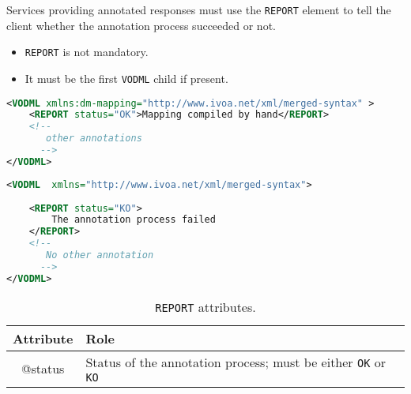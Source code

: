 Services providing annotated responses must use the \texttt{REPORT}  element to tell the client whether the annotation process succeeded or not.

\begin{itemize}
\item \texttt{REPORT} is not mandatory.
\item It must be the first \texttt{VODML} child if present.
\end{itemize}

\begin{lstlisting}[caption={\texttt{REPORT} example for an valid annotation (see in \ref{REPORT_snippet}).},language=XML]
 <VODML xmlns:dm-mapping="http://www.ivoa.net/xml/merged-syntax" >
    <REPORT status="OK">Mapping compiled by hand</REPORT>
	<!-- 
	   other annotations
	  -->	
</VODML>
\end{lstlisting}

\begin{lstlisting}[caption={\texttt{REPORT} example for an annotation failure.},language=XML]
<VODML	xmlns="http://www.ivoa.net/xml/merged-syntax">
	
	<REPORT status="KO">
	    The annotation process failed
	</REPORT>
	<!-- 
	   No other annotation
	  -->	
</VODML>
\end{lstlisting}


\begin{table}[!htbp]
  \small
  \centering
  \begin{tabulary}{\linewidth}{|c|J|}       
    \hline 
         \textbf{Attribute} & 
         \textbf {Role}\\
    \hline
    \hline  
         @status  & 
        Status of the annotation process; must be either \texttt{OK} or \texttt{KO} \\
    \hline 
  \end{tabulary}
  \caption{\texttt{REPORT} attributes.} 
  \label{tbl:report-att}
\end{table}

